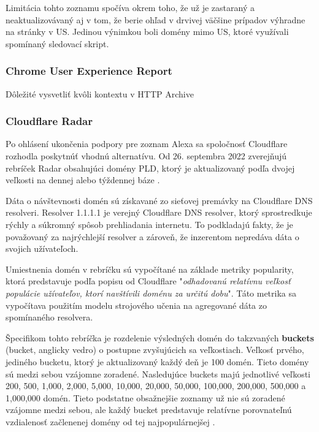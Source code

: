 Limitácia tohto zoznamu spočíva okrem toho, že už je zastaraný a neaktualizovávaný aj v tom, že berie ohľad v drvivej väčšine prípadov výhradne na stránky v US.
Jedinou výnimkou boli domény mimo US, ktoré využívali spomínaný sledovací skript. 

\subsubsection{Chrome User Experience Report}

Dôležité vysvetliť kvôli kontextu v HTTP Archive

\subsubsection{Cloudflare Radar}

Po ohlásení ukončenia podpory pre zoznam Alexa sa spoločnosť Cloudflare rozhodla poskytnúť vhodnú alternatívu.
Od 26. septembra 2022 zverejňujú rebríček Radar obsahujúci domény PLD, ktorý je aktualizovaný podľa dvojej veľkosti na dennej alebo týždennej báze \cite{tranco-methodology}.

Dáta o návštevnosti domén sú získavané zo sieťovej premávky na Cloudflare  DNS resolveri.
Resolver 1.1.1.1 je verejný Cloudflare DNS resolver, ktorý sprostredkuje rýchly a súkromný spôsob prehliadania internetu.
To podkladajú fakty, že je považovaný za najrýchlejší resolver a zároveň, že inzerentom nepredáva dáta o svojich užívateľoch.

Umiestnenia domén v rebríčku sú vypočítané na základe metriky popularity, ktorá predstavuje podľa popisu od Cloudflare "\textit{odhadovanú relatívnu veľkosť populácie užívateľov, ktorí navštívili doménu za určitú dobu}". 
Táto metrika sa vypočítava použitím modelu strojového učenia na agregované dáta zo spomínaného resolvera. 

\pagebreak

Špecifikom tohto rebríčka je rozdelenie výsledných domén do takzvaných \textbf{buckets} (bucket, anglicky vedro) o postupne zvyšujúcich sa veľkostiach.
Veľkosť prvého, jediného bucketu, ktorý je aktualizovaný každý deň je 100 domén. Tieto domény sú medzi sebou vzájomne zoradené.
Nasledujúce buckets majú jednotlivé veľkosti 200, 500, 1,000, 2,000, 5,000, 10,000, 20,000, 50,000, 100,000, 200,000, 500,000 a 1,000,000 domén.
Tieto podstatne obsažnejšie zoznamy už nie sú zoradené vzájomne medzi sebou, ale každý bucket predstavuje relatívne porovnateľnú vzdialenosť začlenenej domény od tej najpopulárnejšej \cite{cloudflare-radar}.

